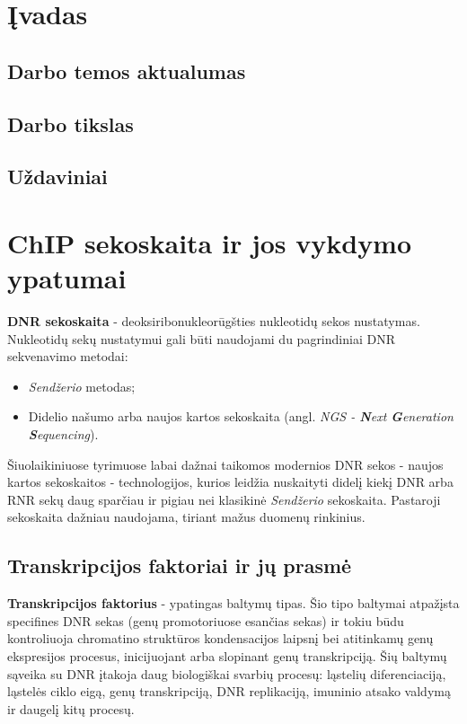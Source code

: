 \documentclass[12pt]{article}
\begin{document}
\newpage


\section{Įvadas}
\subsection*{Darbo temos aktualumas}
\subsection*{Darbo tikslas}
\subsection*{Uždaviniai}
\newpage


\section{ChIP sekoskaita ir jos vykdymo ypatumai}

\textbf{DNR sekoskaita} - deoksiribonukleorūgšties nukleotidų sekos nustatymas.
Nukleotidų sekų nustatymui gali būti naudojami du pagrindiniai DNR sekvenavimo 
metodai:

\begin{itemize}
    \item \emph{Sendžerio} metodas;
    \item Didelio našumo arba naujos kartos sekoskaita
    (angl. \emph{NGS - \textbf{N}ext \textbf{G}eneration \textbf{S}equencing}).
\end{itemize}

Šiuolaikiniuose tyrimuose labai dažnai taikomos modernios DNR sekos - naujos 
kartos sekoskaitos - technologijos, kurios leidžia nuskaityti didelį kiekį
DNR arba RNR sekų daug sparčiau ir pigiau nei klasikinė \emph{Sendžerio} 
sekoskaita. Pastaroji sekoskaita dažniau naudojama, tiriant mažus duomenų
rinkinius.

\subsection{Transkripcijos faktoriai ir jų prasmė}

\textbf{Transkripcijos faktorius} - ypatingas baltymų tipas. Šio tipo baltymai
atpažįsta specifines DNR sekas (genų promotoriuose esančias sekas) ir tokiu būdu
kontroliuoja chromatino struktūros kondensacijos laipsnį bei atitinkamų genų
ekspresijos procesus, inicijuojant arba slopinant genų transkripciją. Šių
baltymų sąveika su DNR įtakoja daug biologiškai svarbių procesų: ląstelių
diferenciaciją, ląstelės ciklo eigą, genų transkripciją, DNR replikaciją,
imuninio atsako valdymą ir daugelį kitų procesų\cite{ARTICLE10, ARTICLE11}.
\end{document}
